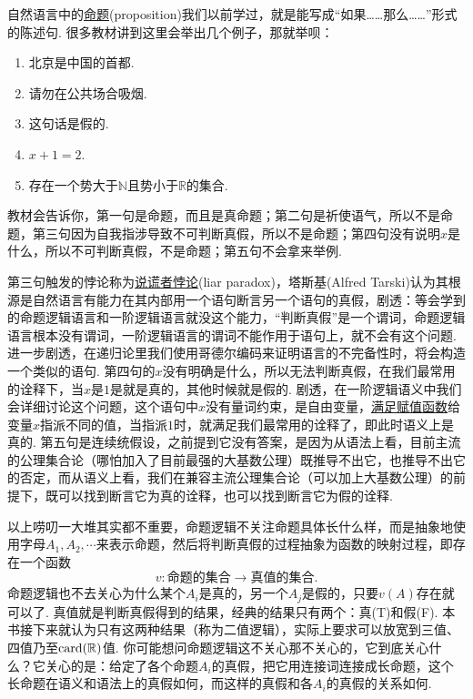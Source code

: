 \documentclass[main.tex]{subfiles}
\begin{document}
自然语言中的\uline{命题}(proposition)我们以前学过，就是能写成“如果……那么……”形式的陈述句. 很多教材讲到这里会举出几个例子，那就举呗：
\begin{enumerate}
    \item 北京是中国的首都.
    \item 请勿在公共场合吸烟.
    \item 这句话是假的.
    \item \(x+1=2\).
    \item 存在一个势大于\(\mathbb{N}\)且势小于\(\mathbb{R}\)的集合.
\end{enumerate}
教材会告诉你，第一句是命题，而且是真命题；第二句是祈使语气，所以不是命题，第三句因为自我指涉导致不可判断真假，所以不是命题；第四句没有说明\(x\)是什么，所以不可判断真假，不是命题；第五句不会拿来举例.
\begin{note}
    第三句触发的悖论称为\uline{说谎者悖论}(liar paradox)，塔斯基(Alfred Tarski)认为其根源是自然语言有能力在其内部用一个语句断言另一个语句的真假，剧透：等会学到的命题逻辑语言和一阶逻辑语言就没这个能力，“判断真假”是一个谓词，命题逻辑语言根本没有谓词，一阶逻辑语言的谓词不能作用于语句上，就不会有这个问题. 进一步剧透，在递归论里我们使用哥德尔编码来证明语言的不完备性时，将会构造一个类似的语句. 第四句的\(x\)没有明确是什么，所以无法判断真假，在我们最常用的诠释下，当\(x\)是\(1\)是就是真的，其他时候就是假的. 剧透，在一阶逻辑语义中我们会详细讨论这个问题，这个语句中\(x\)没有量词约束，是自由变量，\uline{满足赋值函数}给变量\(x\)指派不同的值，当指派\(1\)时，就满足我们最常用的诠释了，即此时语义上是真的. 第五句是连续统假设，之前提到它没有答案，是因为从语法上看，目前主流的公理集合论（哪怕加入了目前最强的大基数公理）既推导不出它，也推导不出它的否定，而从语义上看，我们在兼容主流公理集合论（可以加上大基数公理）的前提下，既可以找到断言它为真的诠释，也可以找到断言它为假的诠释. 
\end{note}

以上唠叨一大堆其实都不重要，命题逻辑不关注命题具体长什么样，而是抽象地使用字母\(A_1, A_2, \cdots\)来表示命题，然后将判断真假的过程抽象为函数的映射过程，即存在一个函数
\[v: \mbox{命题的集合} \to \mbox{真值的集合}.\] 
命题逻辑也不去关心为什么某个\(A_i\)是真的，另一个\(A_j\)是假的，只要\(v(A)\)存在就可以了. 真值就是判断真假得到的结果，经典的结果只有两个：真(T)和假(F). 本书接下来就认为只有这两种结果（称为二值逻辑），实际上要求可以放宽到三值、四值乃至\({\rm card}(\mathbb{R})\)值. 你可能想问命题逻辑这不关心那不关心的，它到底关心什么？它关心的是：给定了各个命题\(A_i\)的真假，把它用连接词连接成长命题，这个长命题在语义和语法上的真假如何，而这样的真假和各\(A_i\)的真假的关系如何. 
\end{document}
